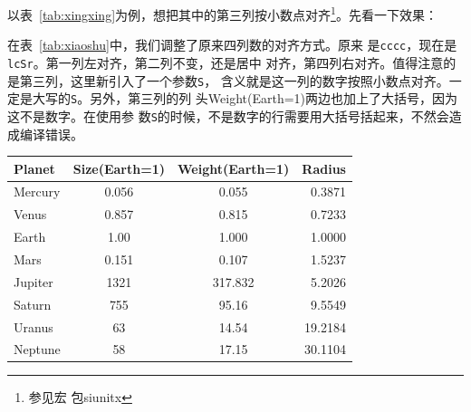 以表~\ref{tab:xingxing}为例，想把其中的第三列按小数点对齐\footnote{参见宏
  包siunitx}。先看一下效果：

在表~\ref{tab:xiaoshu}中，我们调整了原来四列数的对齐方式。原来
是\texttt{cccc}，现在是\texttt{lcSr}。第一列左对齐，第二列不变，还是居中
对齐，第四列右对齐。值得注意的是第三列，这里新引入了一个参数\texttt{S}，
含义就是这一列的数字按照小数点对齐。一定是大写的\texttt{S}。另外，第三列的列
头Weight(Earth=1)两边也加上了大括号，因为这不是数字。在使用参
数\texttt{S}的时候，不是数字的行需要用大括号括起来，不然会造成编译错误。

\begin{table}[htbp]
  \centering
  \vspace{0.2cm}
  \wuhao
  \begin{tabular}{lcSr}
    \toprule
    Planet  & Size(Earth=1) & {Weight(Earth=1)} & Radius  \\
    \midrule
    Mercury & 0.056         & 0.055             & 0.3871  \\
    Venus   & 0.857         & 0.815             & 0.7233  \\
    Earth   & 1.00          & 1.000             & 1.0000  \\
    Mars    & 0.151         & 0.107             & 1.5237  \\
    Jupiter & 1321          & 317.832           & 5.2026  \\
    Saturn  & 755           & 95.16             & 9.5549  \\
    Uranus  & 63            & 14.54             & 19.2184 \\
    Neptune & 58            & 17.15             & 30.1104 \\
    \bottomrule
  \end{tabular}
\end{table}

